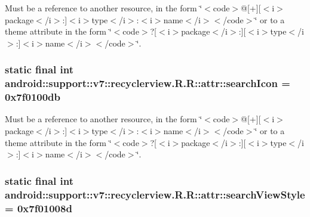 Must be a reference to another resource, in the form \char`\"{}$<$code$>$@\mbox{[}+\mbox{]}\mbox{[}$<$i$>$package$<$/i$>$:\mbox{]}$<$i$>$type$<$/i$>$:$<$i$>$name$<$/i$>$$<$/code$>$\char`\"{} or to a theme attribute in the form \char`\"{}$<$code$>$?\mbox{[}$<$i$>$package$<$/i$>$:\mbox{]}\mbox{[}$<$i$>$type$<$/i$>$:\mbox{]}$<$i$>$name$<$/i$>$$<$/code$>$\char`\"{}. \hypertarget{classandroid_1_1support_1_1v7_1_1recyclerview_1_1_r_1_1attr_f3a7f047197d008315bde8fdda15086f}{
\subsubsection[{searchIcon}]{\setlength{\rightskip}{0pt plus 5cm}static final int android::support::v7::recyclerview.R.R::attr::searchIcon = 0x7f0100db}}
\label{classandroid_1_1support_1_1v7_1_1recyclerview_1_1_r_1_1attr_f3a7f047197d008315bde8fdda15086f}


Must be a reference to another resource, in the form \char`\"{}$<$code$>$@\mbox{[}+\mbox{]}\mbox{[}$<$i$>$package$<$/i$>$:\mbox{]}$<$i$>$type$<$/i$>$:$<$i$>$name$<$/i$>$$<$/code$>$\char`\"{} or to a theme attribute in the form \char`\"{}$<$code$>$?\mbox{[}$<$i$>$package$<$/i$>$:\mbox{]}\mbox{[}$<$i$>$type$<$/i$>$:\mbox{]}$<$i$>$name$<$/i$>$$<$/code$>$\char`\"{}. \hypertarget{classandroid_1_1support_1_1v7_1_1recyclerview_1_1_r_1_1attr_1e3308b912faf5a5d1ce5532cc56663d}{
\subsubsection[{searchViewStyle}]{\setlength{\rightskip}{0pt plus 5cm}static final int android::support::v7::recyclerview.R.R::attr::searchViewStyle = 0x7f01008d}}
\label{classandroid_1_1support_1_1v7_1_1recyclerview_1_1_r_1_1attr_1e3308b912faf5a5d1ce5532cc56663d}


